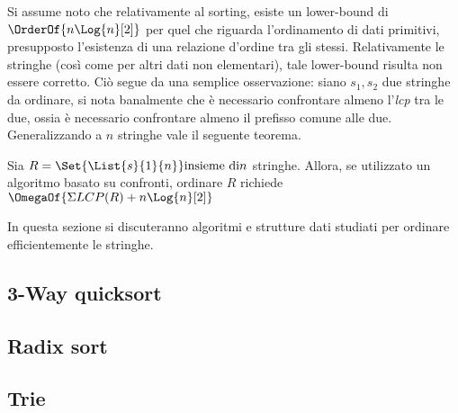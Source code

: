 \documentclass{subfiles}
\begin{document}
Si assume noto che relativamente al sorting, esiste un lower-bound di \(\OrderOf{n \Log{n}[2]}\) per quel che riguarda l'ordinamento di dati primitivi,
presupposto l'esistenza di una relazione d'ordine tra gli stessi.
Relativamente le stringhe (così come per altri dati non elementari), tale lower-bound risulta non essere corretto.
Ciò segue da una semplice osservazione: siano \(s_1, s_2\) due stringhe da ordinare, si nota banalmente che è necessario confrontare almeno l'\emph{lcp} tra le due,
ossia è necessario confrontare almeno il prefisso comune alle due. Generalizzando a \(n\) stringhe vale il seguente teorema.
\begin{Theorem}
    Sia \(R = \Set{\List{s}{1}{n}} \text{insieme di} n\) stringhe.
    Allora, se utilizzato un algoritmo basato su confronti, ordinare \(R\) richiede \(\OmegaOf{\Sigma LCP(R) + n \Log{n}[2]}\)
\end{Theorem}

In questa sezione si discuteranno algoritmi e strutture dati studiati per ordinare efficientemente le stringhe.

\subsection{3-Way quicksort}


\subsection{Radix sort}


\subsection{Trie}

\clearpage
\end{document}
